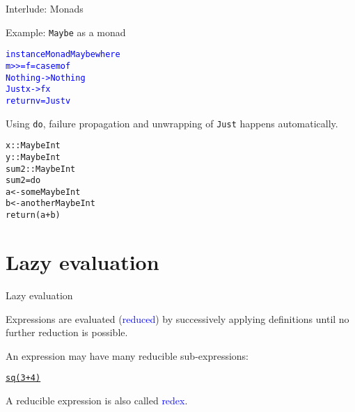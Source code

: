 \documentclass{beamer}
\def\code#1{\texttt{\frenchspacing#1}}
\begin{document}
\begin{frame}[fragile]{Interlude: Monads}

\begin{exampleblock}{Example: \code{Maybe} as a monad}
\begin{alltt}
\textcolor{blue}{instance Monad Maybe where}
  \textcolor{blue}{m >>= f = case m of}
              \textcolor{blue}{Nothing -> Nothing}
              \textcolor{blue}{Just x  -> f x}
  \textcolor{blue}{return v = Just v}
\end{alltt}

\pause

Using \code{do}, failure propagation and unwrapping of \code{Just} happens automatically.

\pause

\begin{alltt}
x :: Maybe Int
y :: Maybe Int
sum2 :: Maybe Int\pause
sum2 = do
  a <- someMaybeInt
  b <- anotherMaybeInt
  return (a + b)
\end{alltt}

\end{exampleblock}

\end{frame}

\section{Lazy evaluation}

\begin{frame}[fragile]{Lazy evaluation}

Expressions are evaluated (\textcolor{blue}{reduced}) by successively applying definitions until no further reduction is possible.

\pause

\vspace{1cm}
An expression may have many reducible sub-expressions:

\begin{alltt}
\centering \underline{sq \underline{(3+4)}}
\end{alltt}

A reducible expression is also called \textcolor{blue}{redex}.

\end{frame}
\end{document}
